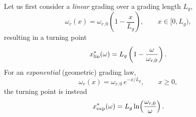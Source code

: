 Let us first consider a \emph{linear} grading over a grading length $L_g$,
\begin{equation}\label{eq:linear_chirp}
    \omega_r(x) = \omega_{r,0}\left(1-\frac{x}{L_g}\right), \qquad x\in[0,L_g),
\end{equation}
resulting in a turning point
\begin{equation}\label{eq:x_star_linear}
    x^*_{\rm lin}(\omega) = L_g\left(1-\frac{\omega}{\omega_{r,0}}\right).
\end{equation}
For an \emph{exponential} (geometric) grading law,
\begin{equation}\label{eq:exp_chirp}
    \omega_r(x) = \omega_{r,0}\,e^{-x/L_g}, \qquad x\ge0,
\end{equation}
the turning point is instead
\begin{equation}\label{eq:x_star_exp}
    x^*_{\rm exp}(\omega) = L_g\ln\!\left(\frac{\omega_{r,0}}{\omega}\right).
\end{equation}

